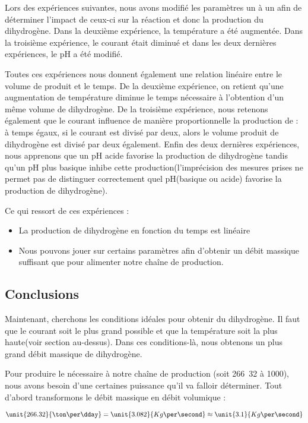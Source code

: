 Lors des expériences suivantes, nous avons modifié les paramètres un à 
un afin de déterminer l'impact de ceux-ci sur la réaction et donc la 
production du dihydrogène. Dans la deuxième expérience, la température
a été augmentée. Dans la troisième expérience, le courant était diminué
et dans les deux dernières expériences, le pH a été modifié.

Toutes ces expériences nous donnent également une relation linéaire 
entre le volume de  produit et le temps. De la deuxième expérience,
on retient qu'une augmentation de température diminue le temps nécessaire 
à l'obtention d'un même volume de dihydrogène. De la troisième expérience, 
nous retenons également que le courant influence de manière proportionnelle
la production de  : à temps égaux, si le courant est divisé par deux,
alors le volume produit de dihydrogène est divisé par deux également. Enfin 
des deux dernières expériences, nous apprenons que un pH acide favorise la
production de dihydrogène tandis qu'un pH plus basique inhibe cette 
production(l'imprécision des mesures prises ne permet pas de distinguer 
correctement quel pH(basique ou acide) favorise la production de dihydrogène).

Ce qui ressort de ces expériences :

\begin{itemize}
	\item La production de dihydrogène en fonction du temps est linéaire
	\item Nous pouvons jouer sur certains paramètres afin d'obtenir un débit
	massique suffisant que pour alimenter notre chaîne de production.
\end{itemize}

\subsection{Conclusions}
Maintenant, cherchons les conditions idéales pour obtenir du dihydrogène.
Il faut que le courant soit le plus grand possible et que la température
soit la plus haute(voir section au-dessus). Dans ces conditions-là, nous
obtenons un plus grand débit massique de dihydrogène.

Pour produire le  nécessaire à notre chaîne de production 
(soit \unit{266.32}{\ton\per\dday} à \unit{1000}{\kelvin}), nous avons besoin d'une 
certaines puissance qu'il va falloir déterminer. Tout d'abord transformons 
le débit massique en débit volumique :

$$\unit{266.32}{\ton\per\dday} = \unit{3.082}{Kg\per\second} \approx \unit{3.1}{Kg\per\second}$$

